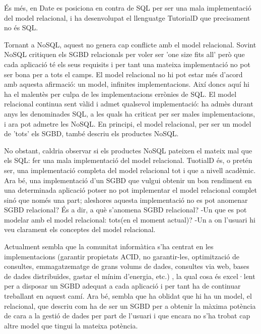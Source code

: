 És més, en Date es posiciona en contra de SQL per ser una mala implementació del model relacional, i ha desenvolupat el llenguatge TutorialD que precisament no és SQL. 


Tornant a NoSQL, aquest no genera cap conflicte amb el model relacional. Sovint NoSQL critiquen els SGBD relacionals per voler ser 'one size fits all' \parencite{stonebraker07,stonebraker09} però que cada aplicació té els seus requisits i per tant una mateixa implementació no pot ser bona per a tots el camps. El model relacional no hi pot estar més d'acord amb aquesta afirmació: un model, infinites implementacions. Així doncs aquí hi ha el malentès per culpa de les implementacions errònies de SQL. El model relacional continua sent vàlid i admet qualsevol implementació: ha admès durant anys les denominades SQL, a les quals ha criticat per ser males implementacions, i ara pot admetre les NoSQL. En principi, el model relacional, per ser un model de 'tots' els SGBD, també descriu els productes NoSQL.

No obstant, caldria observar si els productes NoSQL pateixen el mateix mal que els SQL: fer una mala implementació del model relacional. TuotialD és, o pretén ser, una implementació completa del model relacional tot i que a nivell acadèmic.
Ara bé, una implementació d'un SGBD que vulgui  obtenir un bon rendiment en una determinada aplicació potser no pot implementar el model relacional complet sinó que només una part; aleshores aquesta implementació no es pot anomenar SGBD relacional? És a dir, a què s'anomena SGBD relacional? -Un que es pot modelar amb el model relacional: tots(en el moment actual)? -Un a on l'usuari hi veu clarament els conceptes del model relacional.

Actualment sembla que la comunitat informàtica s'ha centrat en les implementacions (garantir propietats ACID, no garantir-les, optimització de consultes, emmagatzematge de grans volums de dades, consultes via web, bases de dades distribuïdes, gastar el mínim d'energia, etc.) \parencite{stonebraker07,stonebraker10}, la qual cosa és excel·lent per a disposar un SGBD adequat a cada aplicació i per tant ha de continuar treballant en aquest camí. Ara bé, sembla que ha oblidat que hi ha un model, el relacional, que descriu com ha de ser un SGBD per a obtenir la màxima potència de cara a la gestió de dades per part de l'usuari i que encara no s'ha trobat cap altre model que tingui la mateixa potència. 







